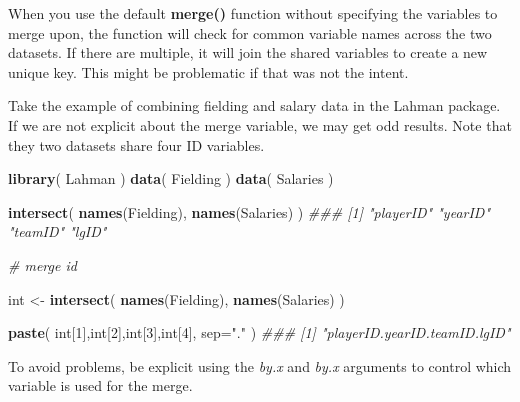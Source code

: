 \documentclass[]{book}
\newenvironment{Shaded}{\begin{snugshade}}{\end{snugshade}}
\newcommand{\CommentTok}[1]{\textcolor[rgb]{0.56,0.35,0.01}{\textit{#1}}}
\newcommand{\DataTypeTok}[1]{\textcolor[rgb]{0.13,0.29,0.53}{#1}}
\newcommand{\DecValTok}[1]{\textcolor[rgb]{0.00,0.00,0.81}{#1}}
\newcommand{\KeywordTok}[1]{\textcolor[rgb]{0.13,0.29,0.53}{\textbf{#1}}}
\newcommand{\NormalTok}[1]{#1}
\newcommand{\StringTok}[1]{\textcolor[rgb]{0.31,0.60,0.02}{#1}}
\theoremstyle{definition}
\theoremstyle{definition}
\theoremstyle{definition}
\theoremstyle{remark}
\begin{document}
When you use the default \textbf{merge()} function without specifying
the variables to merge upon, the function will check for common variable
names across the two datasets. If there are multiple, it will join the
shared variables to create a new unique key. This might be problematic
if that was not the intent.

Take the example of combining fielding and salary data in the Lahman
package. If we are not explicit about the merge variable, we may get odd
results. Note that they two datasets share four ID variables.

\begin{Shaded}
\begin{Highlighting}[]
\KeywordTok{library}\NormalTok{( Lahman )}
\KeywordTok{data}\NormalTok{( Fielding )}
\KeywordTok{data}\NormalTok{( Salaries )}
\end{Highlighting}
\end{Shaded}

\begin{Shaded}
\begin{Highlighting}[]
\KeywordTok{intersect}\NormalTok{( }\KeywordTok{names}\NormalTok{(Fielding), }\KeywordTok{names}\NormalTok{(Salaries) )}
\CommentTok{### [1] "playerID" "yearID"   "teamID"   "lgID"}

\CommentTok{# merge id}

\NormalTok{int <-}\StringTok{ }\KeywordTok{intersect}\NormalTok{( }\KeywordTok{names}\NormalTok{(Fielding), }\KeywordTok{names}\NormalTok{(Salaries) )}

\KeywordTok{paste}\NormalTok{( int[}\DecValTok{1}\NormalTok{],int[}\DecValTok{2}\NormalTok{],int[}\DecValTok{3}\NormalTok{],int[}\DecValTok{4}\NormalTok{], }\DataTypeTok{sep=}\StringTok{"."}\NormalTok{ )}
\CommentTok{### [1] "playerID.yearID.teamID.lgID"}
\end{Highlighting}
\end{Shaded}

To avoid problems, be explicit using the \emph{by.x} and \emph{by.x}
arguments to control which variable is used for the merge.
\end{document}
